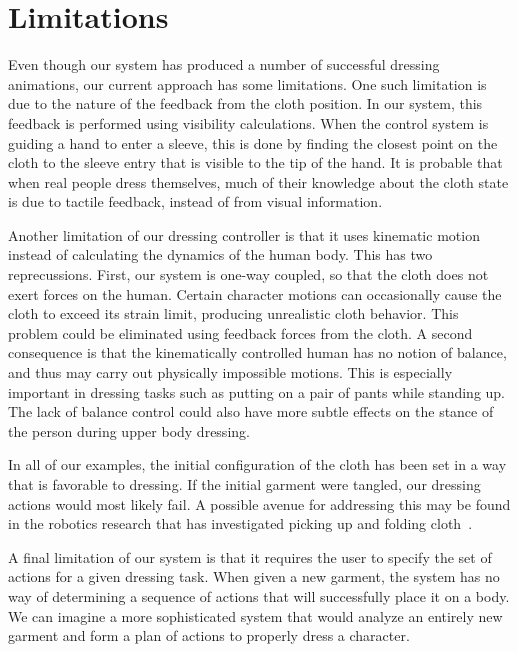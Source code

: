 \section{Limitations}

Even though our system has produced a number of successful dressing
animations, our current approach has some limitations.  One such
limitation is due to the nature of the feedback from the cloth position.
In our system, this feedback is performed using visibility calculations.
When the control system is guiding a hand to enter a sleeve, this is done
by finding the closest point on the cloth to the sleeve entry that is
visible to the tip of the hand.  It is probable that when real people
dress themselves, much of their knowledge about the cloth state is due
to tactile feedback, instead of from visual information.

Another limitation of our dressing controller is that it uses kinematic
motion instead of calculating the dynamics of the human body.  This has
two reprecussions.  First, our system is one-way coupled, so that the
cloth does not exert forces on the human.  Certain character motions can
occasionally cause the cloth to exceed its strain limit, producing
unrealistic cloth behavior.  This problem could be eliminated using
feedback forces from the cloth.  A second consequence is that the
kinematically controlled human has no notion of balance, and thus may
carry out physically impossible motions.  This is especially important in
dressing tasks such as putting on a pair of pants while standing up.  The
lack of balance control could also have more subtle effects on the stance
of the person during upper body dressing.

In all of our examples, the initial configuration of the cloth has been
set in a way that is favorable to dressing.  If the initial garment were
tangled, our dressing actions would most likely fail.  A possible avenue
for addressing this may be found in the robotics research that has
investigated picking up and folding cloth~\cite{Cusumano:2011:BCD}.

A final limitation of our system is that it requires the user to specify
the set of actions for a given dressing task.  When given a new garment,
the system has no way of determining a sequence of actions that will
successfully place it on a body.  We can imagine a more sophisticated
system that would analyze an entirely new garment and form a plan of
actions to properly dress a character.  

